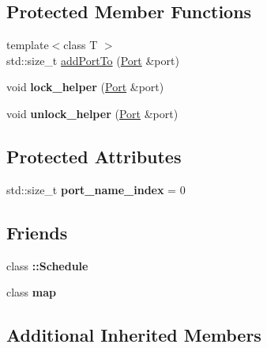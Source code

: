 \subsection*{Protected Member Functions}
\begin{DoxyCompactItemize}
\item 
{\footnotesize template$<$class T $>$ }\\std\+::size\+\_\+t \hyperlink{classraft_1_1parallel__k_a73b5ea02ddaf42293de155d0f256c854}{add\+Port\+To} (\hyperlink{class_port}{Port} \&port)
\item 
\hypertarget{classraft_1_1parallel__k_a60932e6e784dd7950d167b5d4ee5344f}{}\label{classraft_1_1parallel__k_a60932e6e784dd7950d167b5d4ee5344f} 
void {\bfseries lock\+\_\+helper} (\hyperlink{class_port}{Port} \&port)
\item 
\hypertarget{classraft_1_1parallel__k_a614bbcef8b5d5aa053e137ef4654be25}{}\label{classraft_1_1parallel__k_a614bbcef8b5d5aa053e137ef4654be25} 
void {\bfseries unlock\+\_\+helper} (\hyperlink{class_port}{Port} \&port)
\end{DoxyCompactItemize}
\subsection*{Protected Attributes}
\begin{DoxyCompactItemize}
\item 
\hypertarget{classraft_1_1parallel__k_a6cae46ace01fb33bd32147d43dda3eec}{}\label{classraft_1_1parallel__k_a6cae46ace01fb33bd32147d43dda3eec} 
std\+::size\+\_\+t {\bfseries port\+\_\+name\+\_\+index} = 0
\end{DoxyCompactItemize}
\subsection*{Friends}
\begin{DoxyCompactItemize}
\item 
\hypertarget{classraft_1_1parallel__k_a59b0d31ff28240338a2b6e682030ca3c}{}\label{classraft_1_1parallel__k_a59b0d31ff28240338a2b6e682030ca3c} 
class {\bfseries \+::\+Schedule}
\item 
\hypertarget{classraft_1_1parallel__k_aeda338414e516b47761f994fb78056c6}{}\label{classraft_1_1parallel__k_aeda338414e516b47761f994fb78056c6} 
class {\bfseries map}
\end{DoxyCompactItemize}
\subsection*{Additional Inherited Members}


